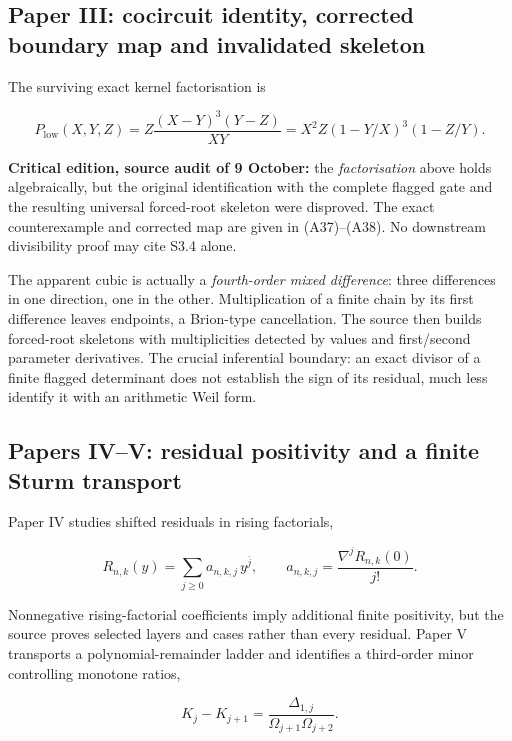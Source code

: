 \documentclass[
  10pt,
  a4paper,
  10pt,
  oneside,
  openany]{book}
\begin{document}
\subsection{Paper III: cocircuit identity, corrected boundary map and
invalidated
skeleton}\label{paper-iii-cocircuit-identity-corrected-boundary-map-and-invalidated-skeleton}

The surviving exact kernel factorisation is

\[
P_{\mathrm{low}}(X,Y,Z)
=Z\frac{(X-Y)^3(Y-Z)}{XY}
=X^2Z(1-Y/X)^3(1-Z/Y).
\tag{S3.4}\label{eq:S3.4}
\]

\textbf{Critical edition, source audit of 9 October:} the
\emph{factorisation} above holds algebraically, but the original
identification with the complete flagged gate and the resulting
universal forced-root skeleton were disproved. The exact counterexample
and corrected map are given in (A37)--(A38). No downstream divisibility
proof may cite S3.4 alone.

The apparent cubic is actually a \emph{fourth-order mixed difference}:
three differences in one direction, one in the other. Multiplication of
a finite chain by its first difference leaves endpoints, a Brion-type
cancellation. The source then builds forced-root skeletons with
multiplicities detected by values and first/second parameter
derivatives. The crucial inferential boundary: an exact divisor of a
finite flagged determinant does not establish the sign of its residual,
much less identify it with an arithmetic Weil form.

\subsection{Papers IV--V: residual positivity and a finite Sturm
transport}\label{papers-ivv-residual-positivity-and-a-finite-sturm-transport}

Paper IV studies shifted residuals in rising factorials,

\[
R_{n,k}(y)=\sum_{j\ge0}a_{n,k,j}\,y^{\overline j},
\qquad a_{n,k,j}=\frac{\nabla^jR_{n,k}(0)}{j!}.
\tag{S3.5}\label{eq:S3.5}
\]

Nonnegative rising-factorial coefficients imply additional finite
positivity, but the source proves selected layers and cases rather than
every residual. Paper V transports a polynomial-remainder ladder and
identifies a third-order minor controlling monotone ratios,

\[
K_j-K_{j+1}=
\frac{\Delta_{1,j}}{\Omega_{j+1}\Omega_{j+2}}.
\tag{S3.6}\label{eq:S3.6}
\]
\end{document}

